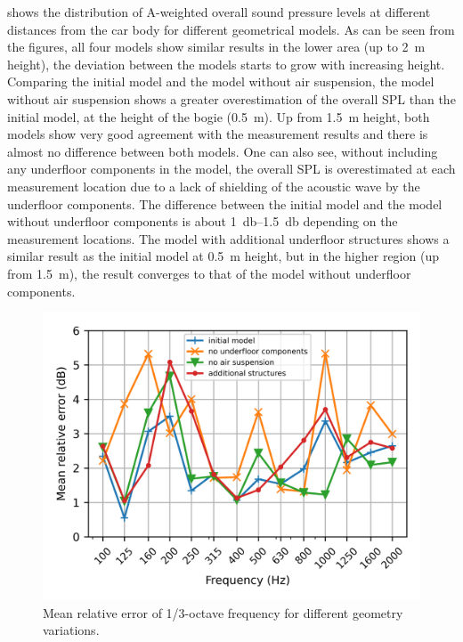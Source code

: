  shows the distribution of  A-weighted overall sound pressure levels at different distances from the car body for different geometrical models.
As can be seen from the figures, all four models show similar results in the lower area (up to \SI{2}{\meter} height), the deviation between the models starts to grow with increasing height. Comparing the initial model and the model without air suspension, the model without air suspension shows a greater overestimation of the overall SPL than the initial model, at the height of the bogie (\SI{0.5}{\meter}). Up from \SI{1.5}{\meter} height, both models show very good agreement with the measurement results and there is almost no difference between both models. One can also see, without including any underfloor components in the model, the overall SPL is overestimated at each measurement location due to a lack of shielding of the acoustic wave by the underfloor components. The difference between the initial model and the model without underfloor components is about \SIrange{1}{1.5}{\decibel} depending on the measurement locations. The model with additional underfloor structures shows a similar result as the initial model at \SI{0.5}{\meter} height, but in the higher region (up from \SI{1.5}{\meter}), the result converges to that of the model without underfloor components.

\begin{figure}
	\centering
	\includegraphics[width=0.7\linewidth]{fig/chap5/geometry_variation/freq_spectrum/average_gap.png}
	\caption{Mean relative error of 1/3-octave frequency for different geometry variations.}
	\label{fig:gap_freq_spectrum_geometry}
\end{figure}

